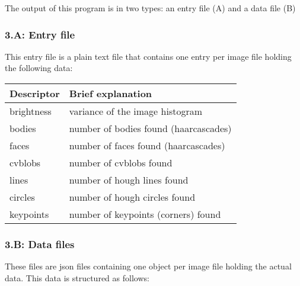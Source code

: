 The output of this program is in two types: an entry file (A) and a data file (B)

\subsubsection*{3.A: Entry file} 
This entry file is a plain text file that contains one entry per image file holding the following data:


\begin{table}
\begin{tabular}{ l | l }

Descriptor   & Brief explanation

\tabularnewline
\hline

brightness   & variance of the image histogram

\tabularnewline
\hline

bodies       & number of bodies found (haarcascades)

\tabularnewline
\hline

faces        & number of faces found (haarcascades)

\tabularnewline
\hline

cvblobs      & number of cvblobs found

\tabularnewline
\hline

lines        & number of hough lines found

\tabularnewline
\hline

circles      & number of hough circles found

\tabularnewline
\hline

keypoints    & number of keypoints (corners) found


\end{tabular}
\end{table}


\subsubsection*{3.B: Data files}

These files are \gls{json} files containing one object per image file holding the actual data. This data is structured as follows:

